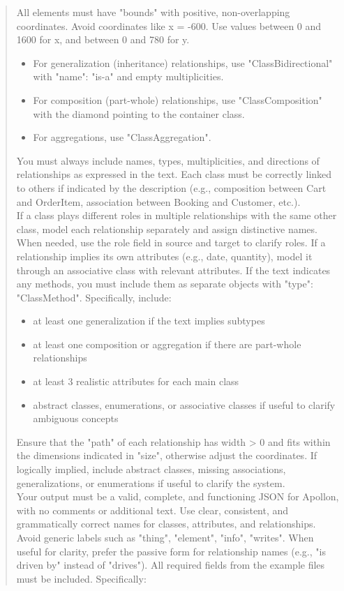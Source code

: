 \begin{quote}
    All elements must have "bounds" with positive, non-overlapping coordinates. Avoid coordinates like x = -600. Use values between 0 and 1600 for x, and between 0 and 780 for y.
    \begin{itemize}
        \item For generalization (inheritance) relationships, use "ClassBidirectional" with "name": "is-a" and empty multiplicities.
        \item For composition (part-whole) relationships, use "ClassComposition" with the diamond pointing to the container class.
        \item For aggregations, use "ClassAggregation".
    \end{itemize}
    You must always include names, types, multiplicities, and directions of relationships as expressed in the text. Each class must be correctly linked to others if indicated by the description (e.g., composition between Cart and OrderItem, association between Booking and Customer, etc.). \\
    If a class plays different roles in multiple relationships with the same other class, model each relationship separately and assign distinctive names. When needed, use the role field in source and target to clarify roles. If a relationship implies its own attributes (e.g., date, quantity), model it through an associative class with relevant attributes. If the text indicates any methods, you must include them as separate objects with "type": "ClassMethod".
    Specifically, include:
    \begin{itemize}
        \item at least one generalization if the text implies subtypes
        \item at least one composition or aggregation if there are part-whole relationships
        \item at least 3 realistic attributes for each main class
        \item abstract classes, enumerations, or associative classes if useful to clarify ambiguous concepts
    \end{itemize}
    Ensure that the "path" of each relationship has width > 0 and fits within the dimensions indicated in "size", otherwise adjust the coordinates. If logically implied, include abstract classes, missing associations, generalizations, or enumerations if useful to clarify the system.\\
    Your output must be a valid, complete, and functioning JSON for Apollon, with no comments or additional text. Use clear, consistent, and grammatically correct names for classes, attributes, and relationships. Avoid generic labels such as "thing", "element", "info", "writes". When useful for clarity, prefer the passive form for relationship names (e.g., "is driven by" instead of "drives"). All required fields from the example files must be included. Specifically:

\end{quote}
